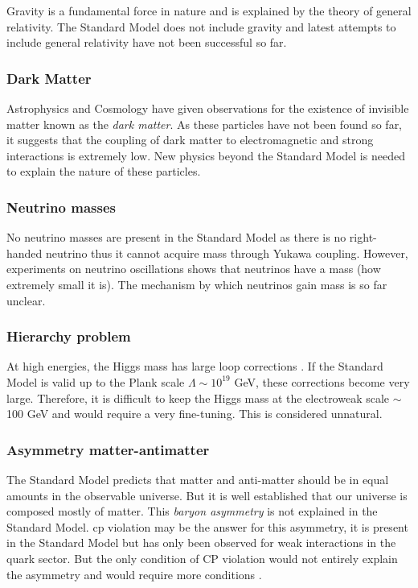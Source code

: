 Gravity is a fundamental force in nature and is explained by the theory of general relativity. The Standard Model does not include gravity and latest attempts to include general relativity have not been successful so far.

\subsubsection*{Dark Matter}

Astrophysics and Cosmology have given observations for the existence of invisible matter known as the \textit{dark matter}. As these particles have not been found so far, it suggests that the coupling of dark matter to electromagnetic and strong interactions is extremely low. New physics beyond the Standard Model is needed to explain the nature of these particles.

\subsubsection*{Neutrino masses}

No neutrino masses are present in the Standard Model as there is no right-handed neutrino thus it cannot acquire mass through Yukawa coupling. However, experiments on neutrino oscillations \cite{Dore:2008dp} shows that neutrinos have a mass (how extremely small it is). The mechanism by which neutrinos gain mass is so far unclear.

\subsubsection*{Hierarchy problem}

At high energies, the Higgs mass has large loop corrections \cite{Vieira:2012ex}. If the Standard Model is valid up to the Plank scale $\Lambda \sim 10^19$ GeV, these corrections become very large. Therefore, it is difficult to keep the Higgs mass at the electroweak scale $\sim$100 GeV and would require a very fine-tuning. This is considered unnatural.

\subsubsection*{Asymmetry matter-antimatter}

The Standard Model predicts that matter and anti-matter should be in equal amounts in the observable universe. But it is well established that our universe is composed mostly of matter. This \textit{baryon asymmetry} is not explained in the Standard Model. \acrshort{cp} violation \cite{Ellis:1978hq} may be the answer for this asymmetry, it is present in the Standard Model but has only been observed for weak interactions in the quark sector. But the only condition of CP violation would not entirely explain the asymmetry and would require more conditions \cite{Sakharov:1967dj}.

